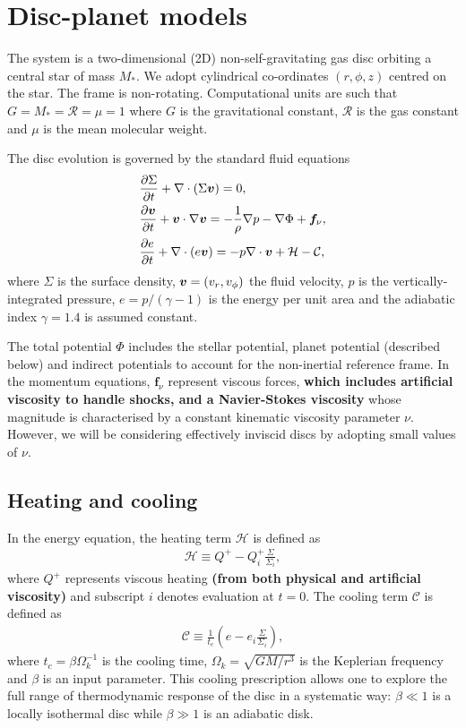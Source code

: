 \section{Disc-planet models}\label{model}
The system is a two-dimensional (2D) non-self-gravitating gas disc orbiting
a central star of mass $M_*$. We adopt cylindrical
co-ordinates $(r,\phi,z)$ centred on the star. The frame is   
non-rotating. Computational units are such that 
$G=M_*=\mathcal{R}=\mu=1$ where $G$ is the gravitational constant,
$\mathcal{R}$ is the gas constant and $\mu$ is the mean molecular
weight. 

The disc evolution is governed by the standard fluid equations  
\begin{align}\label{3d_gov_eq}
  &\frac{\p\Sigma}{\p t}+\nabla\cdot(\Sigma \bv)=0, \\
  & \frac{\p\bv}{\p t}+\bv\cdot\nabla\bv= -\frac{1}{\rho}\nabla p 
  - \nabla{\Phi} + \bm{f}_\nu,\\
  & \frac{\p e}{\p t} + \nabla\cdot(e\bv) = -p\nabla\cdot\bv +
  \mathcal{H} - \mathcal{C}, %
\end{align}
where $\Sigma$ is the surface density, $\bm{v} = (v_r,v_\phi)$ the fluid
velocity, $p$ is the vertically-integrated pressure, $e=p/(\gamma-1)$ is the energy
per unit area and the adiabatic index $\gamma=1.4$ is assumed
constant.  

The total potential $\Phi$ includes the stellar potential, planet potential
(described below) 
and indirect potentials to account for the non-inertial reference
frame. 
In the momentum equations, $\bm{f}_\nu$ represent viscous forces, {\bf
which includes artificial viscosity to handle shocks, and a
Navier-Stokes viscosity } whose magnitude is  
characterised by a constant kinematic viscosity parameter
$\nu$. However, we will be considering effectively inviscid discs by
adopting small values of $\nu$.  

\subsection{Heating and cooling}
In the energy equation, the heating term $\mathcal{H}$ is defined as 
\begin{align}
  \mathcal{H} \equiv Q^+ - Q^+_i\frac{\Sigma}{\Sigma_i}, 
\end{align}
where $Q^+$ represents viscous heating {\bf(from both physical and
  artificial viscosity)} and subscript $i$ denotes
evaluation at $t=0$. The cooling term $\mathcal{C}$ is defined as
\begin{align}
  \mathcal{C} \equiv \frac{1}{t_c}\left(e -
  e_i\frac{\Sigma}{\Sigma_i}\right),  
\end{align}
where $t_c = \beta\Omega_k^{-1}$ is the cooling time,
$\Omega_k=\sqrt{GM/r^3}$ is the Keplerian frequency and $\beta$ is an
input parameter. This cooling prescription allows one 
to explore the full range of thermodynamic response of the disc in a 
systematic way: $\beta\ll1$ is a locally isothermal disc while
$\beta\gg1$ is an adiabatic disk.  


